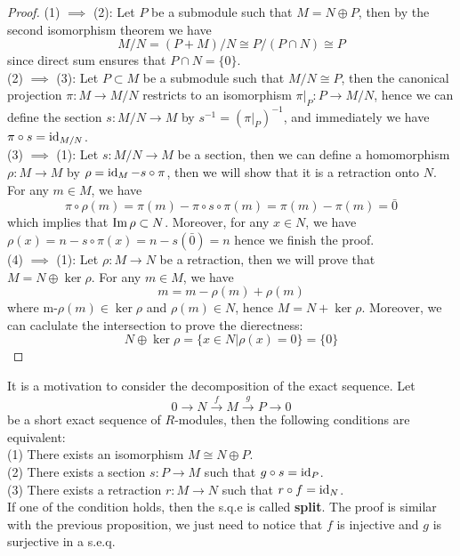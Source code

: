 \begin{proof}
    (1) \(\implies\) (2): Let \(P\) be a submodule such that \(M = N \oplus P\), then by the second isomorphism theorem we have
    \[M/N = (P+M)/N \cong P/(P \cap N) \cong P\]
    since direct sum ensures that \(P \cap N = \{0\}\).\\

    (2) \(\implies\) (3): Let \(P \subset M\) be a submodule such that \(M/N \cong P\), then the canonical projection \(\pi: M \to M/N\) restricts to an isomorphism \(\pi|_P: P \to M/N\), hence we can define the section \(s: M/N \to M\) by \(s^{-1} = (\pi|_P)^{-1}\), and immediately we have \(\pi \circ s = \operatorname{id}_{M/N}\).\\

    (3) \(\implies\) (1): Let \(s: M/N \to M\) be a section, then we can define a homomorphism \(\rho: M \to M\) by \(\rho = \operatorname{id}_M - s \circ \pi\), then we will show that it is a retraction onto \(N\). For any \(m \in M\), we have 
    \[\pi\circ\rho(m) = \pi(m) - \pi \circ s \circ \pi(m) = \pi(m) -\pi(m) = \bar{0}\]
    which implies that \(\operatorname{Im} \rho \subset N\). Moreover, for any \(x \in N\), we have \(\rho(x) = n - s\circ\pi(x) = n - s(\bar{0}) = n \)
    hence we finish the proof.\\

    (4) \(\implies\) (1): Let \(\rho: M \to N\) be a retraction, then we will prove that \(M = N \oplus \ker \rho\). For any \(m \in M\), we have
    \[m = m-\rho(m) + \rho(m)\]
    where m-\(\rho(m) \in \ker \rho\) and \(\rho(m) \in N\), hence \(M = N + \ker \rho\). Moreover, we can caclulate the intersection to prove the dierectness:
    \[N \oplus \ker\rho = \{x \in N | \rho(x) = 0\} = \{0\}\]
\end{proof}

\begin{remark}
    It is a motivation to consider the decomposition of the exact sequence. Let
    \[0 \longrightarrow N 
\xrightarrow{f} 
M 
\xrightarrow{g} 
P 
\longrightarrow 0
\]
    be a short exact sequence of \(R\)-modules, then the following conditions are equivalent:\\
    (1) There exists an isomorphism \(M \cong N \oplus P\).\\
    (2) There exists a section \(s: P \to M\) such that \(g \circ s = \operatorname{id}_P\).\\
    (3) There exists a retraction \(r: M \to N\) such that \(r \circ f = \operatorname{id}_N\).\\
    If one of the condition holds, then the s.q.e is called \textbf{split}. The proof is similar with the previous proposition, we just need to notice that \(f\) is injective and \(g\) is surjective in a s.e.q.
\end{remark}

